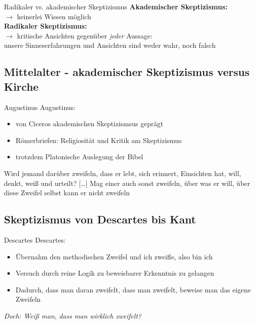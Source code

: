 \documentclass[12pt]{beamer}
\begin{document}
\begin{frame}{Radikaler vs. akademischer Skeptizismus}
\textbf{Akademischer Skeptizismus:}\\
$\rightarrow$ keinerlei Wissen möglich\\
\textbf{Radikaler Skeptizismus:}\\
$\rightarrow$ kritische Ansichten gegenüber \emph{jeder} Aussage:\\
\glqq unsere Sinneserfahrungen und Ansichten sind weder wahr, noch falsch\grqq\ %
\end{frame}

\subsection{Mittelalter - akademischer Skeptizismus versus Kirche}
\begin{frame}{Augustinus}
Augustinus:
\begin{itemize}
\item von Ciceros akademischen Skeptizismsus geprägt
\item Römerbriefen: Religiosität und Kritik am Skeptizismus
\item trotzdem Platonische Auslegung der Bibel
\end{itemize}
\glqq Wird jemand darüber zweifeln, dass er lebt, sich erinnert, Einsichten hat, will, denkt, weiß und urteilt? [\ldots] Mag einer auch sonst zweifeln, über was er will, über diese Zweifel selbst kann er nicht zweifeln\grqq\ %
\end{frame}
\subsection{Skeptizismus von Descartes bis Kant}
\begin{frame}{Descartes}
Descartes:
\begin{itemize}
\item Übernahm den methodischen Zweifel und  \glqq ich zweifle, also bin ich\grqq
\item Versuch durch reine Logik zu beweisbarer Erkenntnis zu gelangen
\item Dadurch, dass man daran zweifelt, dass man zweifelt, beweise man das eigene Zweifeln
\end{itemize}
\emph{Doch: Weiß man, dass man wirklich zweifelt?}
\end{frame}
\end{document}

